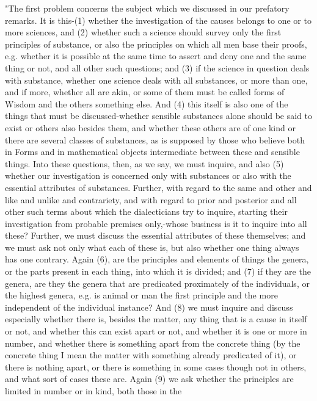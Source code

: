 "The first problem concerns the subject which we discussed in our
prefatory remarks. It is this-(1) whether the investigation of the
causes belongs to one or to more sciences, and (2) whether such a
science should survey only the first principles of substance, or also
the principles on which all men base their proofs, e.g. whether it
is possible at the same time to assert and deny one and the same thing
or not, and all other such questions; and (3) if the science in question
deals with substance, whether one science deals with all substances,
or more than one, and if more, whether all are akin, or some of them
must be called forms of Wisdom and the others something else. And
(4) this itself is also one of the things that must be discussed-whether
sensible substances alone should be said to exist or others also besides
them, and whether these others are of one kind or there are several
classes of substances, as is supposed by those who believe both in
Forms and in mathematical objects intermediate between these and sensible
things. Into these questions, then, as we say, we must inquire, and
also (5) whether our investigation is concerned only with substances
or also with the essential attributes of substances. Further, with
regard to the same and other and like and unlike and contrariety,
and with regard to prior and posterior and all other such terms about
which the dialecticians try to inquire, starting their investigation
from probable premises only,-whose business is it to inquire into
all these? Further, we must discuss the essential attributes of these
themselves; and we must ask not only what each of these is, but also
whether one thing always has one contrary. Again (6), are the principles
and elements of things the genera, or the parts present in each thing,
into which it is divided; and (7) if they are the genera, are they
the genera that are predicated proximately of the individuals, or
the highest genera, e.g. is animal or man the first principle and
the more independent of the individual instance? And (8) we must inquire
and discuss especially whether there is, besides the matter, any thing
that is a cause in itself or not, and whether this can exist apart
or not, and whether it is one or more in number, and whether there
is something apart from the concrete thing (by the concrete thing
I mean the matter with something already predicated of it), or there
is nothing apart, or there is something in some cases though not in
others, and what sort of cases these are. Again (9) we ask whether
the principles are limited in number or in kind, both those in the
